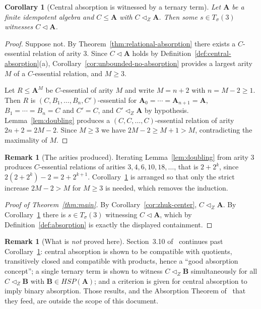 \documentclass[11pt]{article}
\theoremstyle{mainplain}
\newtheorem{corollary}[theorem]{Corollary}
\theoremstyle{mainroman}
\theoremstyle{definition}
\newtheorem{remark}[theorem]{Remark}
\numberwithin{equation}{section}
\newcommand{\bA}{\mathbf A}
\newcommand{\bB}{\mathbf B}
\newcommand{\ab}{\lhd}
\newcommand{\aZ}{\lhd_{Z}}
\newcommand{\Tm}{T_\sigma}
\begin{document}
\begin{corollary}[Central absorption is witnessed by a ternary term]\label{cor:central-ternary}
Let $\bA$ be a finite idempotent algebra and $C\le\bA$ with $C\aZ\bA$. Then
some $s\in\Tm(3)$ witnesses $C\ab\bA$.
\end{corollary}
\begin{proof}
Suppose not. By Theorem~\ref{thm:relational-absorption} there exists a
$C$-essential relation of arity $3$. Since $C\ab\bA$ holds by
Definition~\ref{def:central-absorption}(a),
Corollary~\ref{cor:unbounded-no-absorption} provides a largest arity $M$ of a
$C$-essential relation, and $M\ge3$.

Let $R\le\bA^{M}$ be $C$-essential of arity $M$ and write $M=n+2$ with
$n=M-2\ge1$. Then $R$ is $(C,B_1,\dots,B_n,C')$-essential for
$\bA_0=\cdots=\bA_{n+1}=\bA$, $B_1=\cdots=B_n=C$ and $C'=C$, and $C'\aZ\bA$ by
hypothesis. Lemma~\ref{lem:doubling} produces a
$(C,C,\dots,C)$-essential relation of arity $2n+2=2M-2$. Since $M\ge3$ we have
$2M-2\ge M+1>M$, contradicting the maximality of $M$.
\end{proof}

\begin{remark}[The arities produced]\label{rem:arities}
Iterating Lemma~\ref{lem:doubling} from arity $3$ produces $C$-essential
relations of arities $3,4,6,10,18,\dots$, that is $2+2^{k}$, since
$2(2+2^{k})-2=2+2^{k+1}$. Corollary~\ref{cor:central-ternary} is arranged so
that only the strict increase $2M-2>M$ for $M\ge3$ is needed, which removes the
induction.
\end{remark}

\begin{proof}[Proof of Theorem~\ref{thm:main}]
By Corollary~\ref{cor:zhuk-center}, $C\aZ\bA$. By
Corollary~\ref{cor:central-ternary} there is $s\in\Tm(3)$ witnessing
$C\ab\bA$, which by Definition~\ref{def:absorption} is exactly the displayed
containment.
\end{proof}

\begin{remark}[What is \emph{not} proved here]\label{rem:not-proved}
Section~3.10 of~\cite{BradyNotes} continues past
Corollary~\ref{cor:central-ternary}: central absorption is shown to be
compatible with quotients, transitively closed and compatible with products,
hence a ``good absorption concept''; a single ternary term is shown to witness
$C\aZ\bB$ simultaneously for all $C\aZ\bB$ with $\bB\in HSP(\bA)$; and a
criterion is given for central absorption to imply binary absorption. Those
results, and the Absorption Theorem of~\cite{BartoKozikCyclic} that they feed,
are outside the scope of this document.
\end{remark}
\end{document}
